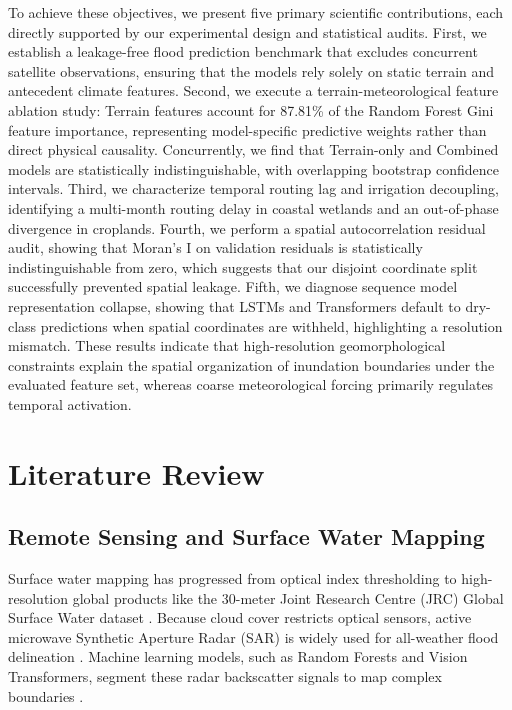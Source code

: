 \documentclass[12pt, a4paper]{article}
\begin{document}
To achieve these objectives, we present five primary scientific contributions, each directly supported by our experimental design and statistical audits. First, we establish a leakage-free flood prediction benchmark that excludes concurrent satellite observations, ensuring that the models rely solely on static terrain and antecedent climate features. Second, we execute a terrain-meteorological feature ablation study: Terrain features account for 87.81\% of the Random Forest Gini feature importance, representing model-specific predictive weights rather than direct physical causality. Concurrently, we find that Terrain-only and Combined models are statistically indistinguishable, with overlapping bootstrap confidence intervals. Third, we characterize temporal routing lag and irrigation decoupling, identifying a multi-month routing delay in coastal wetlands and an out-of-phase divergence in croplands. Fourth, we perform a spatial autocorrelation residual audit, showing that Moran's I on validation residuals is statistically indistinguishable from zero, which suggests that our disjoint coordinate split successfully prevented spatial leakage. Fifth, we diagnose sequence model representation collapse, showing that LSTMs and Transformers default to dry-class predictions when spatial coordinates are withheld, highlighting a resolution mismatch. These results indicate that high-resolution geomorphological constraints explain the spatial organization of inundation boundaries under the evaluated feature set, whereas coarse meteorological forcing primarily regulates temporal activation.


\section{Literature Review}

\subsection{Remote Sensing and Surface Water Mapping}
Surface water mapping has progressed from optical index thresholding \citep{Amani2020Google} to high-resolution global products like the 30-meter Joint Research Centre (JRC) Global Surface Water dataset \citep{Pekel2016Highresolution, Liu2021FinerResolution, Yang202130}. Because cloud cover restricts optical sensors, active microwave Synthetic Aperture Radar (SAR) is widely used for all-weather flood delineation \citep{Twele2016Sentinel1}. Machine learning models, such as Random Forests and Vision Transformers, segment these radar backscatter signals to map complex boundaries \citep{Phan2020Land, Bazi2021Vision}.
\end{document}
